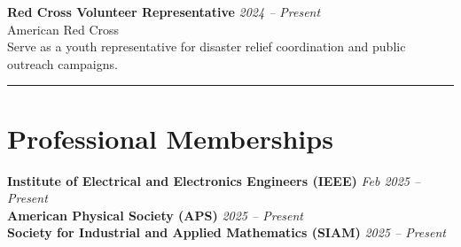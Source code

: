 \documentclass[a4paper,10pt]{article}
\newcommand{\sectionline}{\noindent\rule{\linewidth}{0.5mm}}
\begin{document}
\textbf{Red Cross Volunteer Representative} \hfill \textit{2024 -- Present} \\
American Red Cross \\
Serve as a youth representative for disaster relief coordination and public outreach campaigns.

\sectionline

\section*{Professional Memberships}
\textbf{Institute of Electrical and Electronics Engineers (IEEE)} \hfill \textit{Feb 2025 -- Present} \\
\textbf{American Physical Society (APS)} \hfill \textit{2025 -- Present} \\
\textbf{Society for Industrial and Applied Mathematics (SIAM)} \hfill \textit{2025 -- Present}
\end{document}
